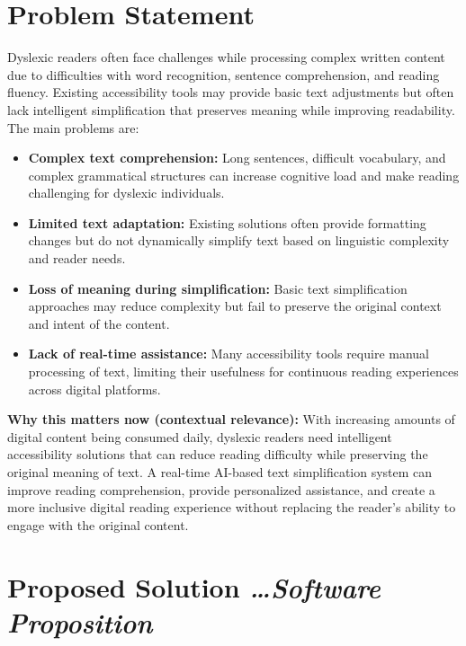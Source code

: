\documentclass[11pt,a4paper]{article}
\newcommand{\BvrHint}[1]{%
  {\normalfont\normalsize\itshape\hfill #1}}
\begin{document}
\newpage
\section{Problem Statement}

Dyslexic readers often face challenges while processing complex written content due to difficulties with word recognition, sentence comprehension, and reading fluency. Existing accessibility tools may provide basic text adjustments but often lack intelligent simplification that preserves meaning while improving readability. The main problems are:

\begin{itemize}[leftmargin=0.7cm]
    \item \textbf{Complex text comprehension:} Long sentences, difficult vocabulary, and complex grammatical structures can increase cognitive load and make reading challenging for dyslexic individuals.
    
    \item \textbf{Limited text adaptation:} Existing solutions often provide formatting changes but do not dynamically simplify text based on linguistic complexity and reader needs.
    
    \item \textbf{Loss of meaning during simplification:} Basic text simplification approaches may reduce complexity but fail to preserve the original context and intent of the content.
    
    \item \textbf{Lack of real-time assistance:} Many accessibility tools require manual processing of text, limiting their usefulness for continuous reading experiences across digital platforms.
    
\end{itemize}
\textbf{Why this matters now (contextual relevance):} With increasing amounts of digital content being consumed daily, dyslexic readers need intelligent accessibility solutions that can reduce reading difficulty while preserving the original meaning of text. A real-time AI-based text simplification system can improve reading comprehension, provide personalized assistance, and create a more inclusive digital reading experience without replacing the reader's ability to engage with the original content.

\section{Proposed Solution %
\BvrHint{\ldots Software Proposition}}
\end{document}
